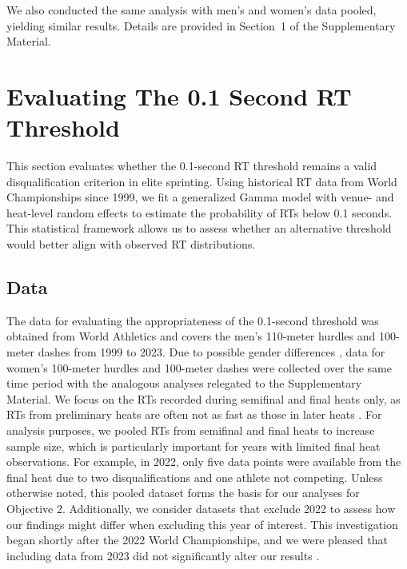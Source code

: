 \documentclass[12pt, letterpaper]{article}
\begin{document}
We also conducted the same analysis with men’s and women’s data
pooled, yielding similar results. Details are provided in Section~1 of
the Supplementary Material.

\section{Evaluating The 0.1 Second RT Threshold}
\label{sec:problem2}

This section evaluates whether the 0.1-second RT threshold remains a valid 
disqualification criterion in elite sprinting. Using historical RT data from 
World Championships since 1999, we fit a generalized Gamma model with 
venue- and heat-level random effects to estimate the probability of RTs below 
0.1 seconds. This statistical framework allows us to assess whether an 
alternative threshold would better align with observed RT distributions.

\subsection{Data}
\label{sec:data_barrier}

The data for evaluating the appropriateness of the 0.1-second
threshold was obtained from World Athletics and covers the men's
110-meter hurdles and 100-meter dashes from 1999 to 2023. Due to
possible gender differences \citep{babicc2009reaction,
  lipps2011implications}, data for women's 100-meter hurdles and
100-meter dashes were collected over the same time period with the analogous 
analyses relegated to the Supplementary Material. We focus on the RTs recorded during
semifinal and final heats only, as RTs from preliminary
heats are often not as fast as those in later heats
\citep[e.g.,][]{collet1999strategic, tonnessen2013reaction,
  brosnan2017effects, zhang2021correlation}. For analysis purposes, we
pooled RTs from semifinal and final heats to increase sample
size, which is particularly important for years with limited final heat
observations. For example, in 2022, only five data points were available
from the final heat due to two disqualifications and one athlete not
competing. Unless otherwise noted, this pooled dataset forms the basis
for our analyses for Objective 2. Additionally, we consider datasets
that exclude 2022 to assess how our findings might differ when excluding
this year of interest. This investigation began shortly after the 2022 World
Championships, and we were pleased that including data from 2023 did not
significantly alter our results \citep{WAData}.  
\end{document}

